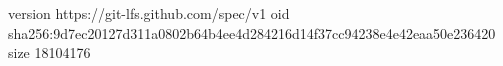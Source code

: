 version https://git-lfs.github.com/spec/v1
oid sha256:9d7ec20127d311a0802b64b4ee4d284216d14f37cc94238e4e42eaa50e236420
size 18104176
